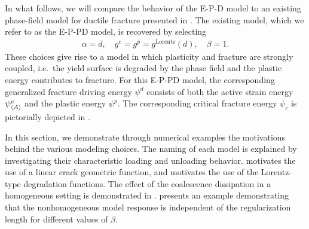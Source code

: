 In what follows, we will compare the behavior of the E-P-D model to an existing phase-field model for ductile fracture presented in \cite{brandon2020cohesive}.  The existing model,
which we refer to as the E-P-PD model,  is recovered by selecting
\begin{align*}
  \alpha = d, \quad g^e = g^p = g^\text{Lorentz}(d), \quad \beta = 1.
\end{align*}
These choices give rise to a model in which plasticity and fracture are strongly coupled, i.e.\ the yield surface is degraded by the phase field and the plastic energy contributes to fracture. For this E-P-PD model, the corresponding generalized fracture driving energy $\psi^d$ consists of both the active strain energy $\psi^e_{\left< A \right>}$ and the plastic energy $\psi^p$.  The corresponding critical fracture energy $\psi_c$ is pictorially depicted in .

In this section, we demonstrate through numerical examples the motivations behind the various modeling choices. The naming of each model is explained  by investigating their characteristic loading and unloading behavior.  motivates the use of a linear crack geometric function, and  motivates the use of the Lorentz-type degradation functions.
The effect of the coalescence dissipation in a homogeneous setting is demonstrated in .
 presents an example demonstrating that the nonhomogeneous model response is independent of the regularization length for different values of $\beta$.

